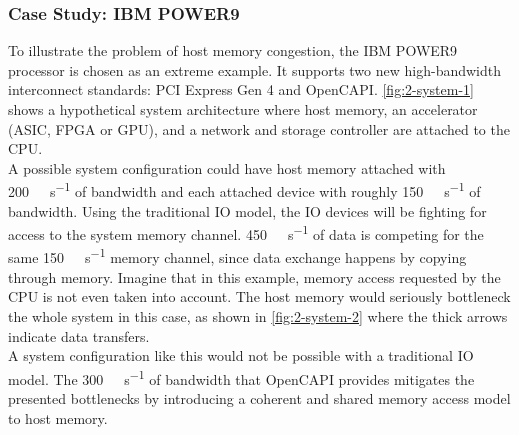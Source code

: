 \subsubsection{Case Study: IBM POWER9}
To illustrate the problem of host memory congestion, the IBM POWER9 processor is chosen as an extreme example. It supports two new high-bandwidth interconnect standards: PCI Express Gen 4 and OpenCAPI. \autoref{fig:2-system-1} shows a hypothetical system architecture where host memory, an accelerator (ASIC, FPGA or GPU), and a network and storage controller are attached to the CPU.\\
A possible system configuration could have host memory attached with \SI{200}{\giga\byte\per\second} of bandwidth and each attached device with roughly \SI{150}{\giga\byte\per\second} of bandwidth. Using the traditional IO model, the IO devices will be fighting for access to the system memory channel. \SI{450}{\giga\byte\per\second} of data is competing for the same \SI{150}{\giga\byte\per\second} memory channel, since data exchange happens by copying through memory.
Imagine that in this example, memory access requested by the CPU is not even taken into account. The host memory would seriously bottleneck the whole system in this case, as shown in \autoref{fig:2-system-2} where the thick arrows indicate data transfers.\\
A system configuration like this would not be possible with a traditional IO model. The \SI{300}{\giga\byte\per\second} of bandwidth that OpenCAPI provides mitigates the presented bottlenecks by introducing a coherent and shared memory access model to host memory.



